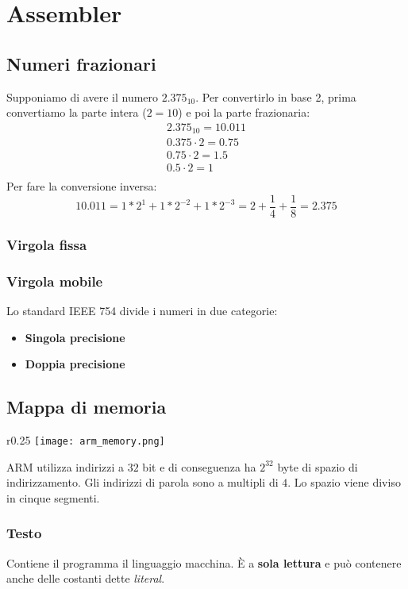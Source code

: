 \newpage
\section{Assembler}
\subsection{Numeri frazionari}
Supponiamo di avere il numero $2.375_{10}$. Per convertirlo in base 2, prima convertiamo la parte intera ($2=10$) e poi la parte frazionaria:
\begin{equation*}
	\begin{split}
		2.375_{10} = 10.011 \\
		0.375 \cdot 2 = 0.75 \\
		0.75 \cdot 2 = 1.5 \\
		0.5 \cdot 2 = 1 \\
	\end{split}
\end{equation*}
Per fare la conversione inversa:
\begin{equation*}
	10.011 = 1*2^1 + 1 * 2^{-2} + 1 * 2^{-3}=2+\frac{1}{4} + \frac{1}{8} = 2.375
\end{equation*}
\subsubsection{Virgola fissa}
\subsubsection{Virgola mobile}
Lo standard IEEE 754 divide i numeri in due categorie:
\begin{itemize}
	\item \textbf{Singola precisione}
	\item \textbf{Doppia precisione}
\end{itemize}

\newpage
\subsection{Mappa di memoria}
\begin{wrapfigure}{r}{0.25\textwidth}
	\texttt{[image: arm\_memory.png]}
\end{wrapfigure}
ARM utilizza indirizzi a $32$ bit e di conseguenza ha $2^{32}$ byte di spazio di indirizzamento. Gli indirizzi di parola sono a multipli di $4$. Lo spazio viene diviso in cinque segmenti.
\subsubsection{Testo}
Contiene il programma il linguaggio macchina. È a \textbf{sola lettura} e può contenere anche delle costanti dette \textit{literal}.
